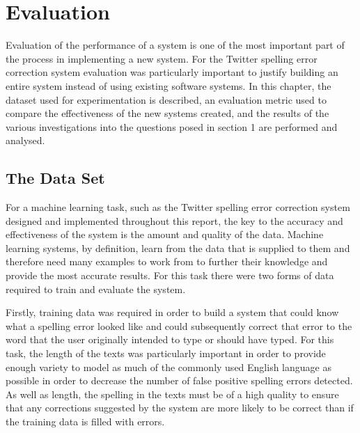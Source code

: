 \chapter{Evaluation}

Evaluation of the performance of a system is one of the most important part of the process in implementing a new system. For the Twitter spelling error correction system evaluation was particularly important to justify building an entire system instead of using existing software systems. In this chapter, the dataset used for experimentation is described, an evaluation metric used to compare the effectiveness of the new systems created, and the results of the various investigations into the questions posed in section 1 are performed and analysed.

\section{The Data Set}

For a machine learning task, such as the Twitter spelling error correction system designed and implemented throughout this report, the key to the accuracy and effectiveness of the system is the amount and quality of the data. Machine learning systems, by definition, learn from the data that is supplied to them and therefore need many examples to work from to further their knowledge and provide the most accurate results. For this task there were two forms of data required to train and evaluate the system.

Firstly, training data was required in order to build a system that could know what a spelling error looked like and could subsequently correct that error to the word that the user originally intended to type or should have typed. For this task, the length of the texts was particularly important in order to provide enough variety to model as much of the commonly used English language as possible in order to decrease the number of false positive spelling errors detected. As well as length, the spelling in the texts must be of a high quality to ensure that any corrections suggested by the system are more likely to be correct than if the training data is filled with errors. 

